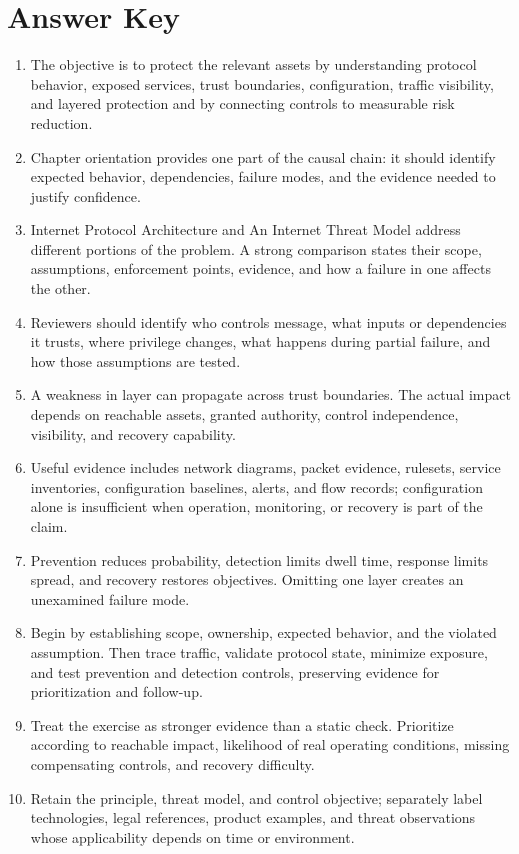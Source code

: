 \documentclass[11pt]{article}
\begin{document}
\section*{Answer Key}
\begin{enumerate}
\item The objective is to protect the relevant assets by understanding protocol behavior, exposed services, trust boundaries, configuration, traffic visibility, and layered protection and by connecting controls to measurable risk reduction.
\item Chapter orientation provides one part of the causal chain: it should identify expected behavior, dependencies, failure modes, and the evidence needed to justify confidence.
\item Internet Protocol Architecture and An Internet Threat Model address different portions of the problem. A strong comparison states their scope, assumptions, enforcement points, evidence, and how a failure in one affects the other.
\item Reviewers should identify who controls message, what inputs or dependencies it trusts, where privilege changes, what happens during partial failure, and how those assumptions are tested.
\item A weakness in layer can propagate across trust boundaries. The actual impact depends on reachable assets, granted authority, control independence, visibility, and recovery capability.
\item Useful evidence includes network diagrams, packet evidence, rulesets, service inventories, configuration baselines, alerts, and flow records; configuration alone is insufficient when operation, monitoring, or recovery is part of the claim.
\item Prevention reduces probability, detection limits dwell time, response limits spread, and recovery restores objectives. Omitting one layer creates an unexamined failure mode.
\item Begin by establishing scope, ownership, expected behavior, and the violated assumption. Then trace traffic, validate protocol state, minimize exposure, and test prevention and detection controls, preserving evidence for prioritization and follow-up.
\item Treat the exercise as stronger evidence than a static check. Prioritize according to reachable impact, likelihood of real operating conditions, missing compensating controls, and recovery difficulty.
\item Retain the principle, threat model, and control objective; separately label technologies, legal references, product examples, and threat observations whose applicability depends on time or environment.
\end{enumerate}
\end{document}

